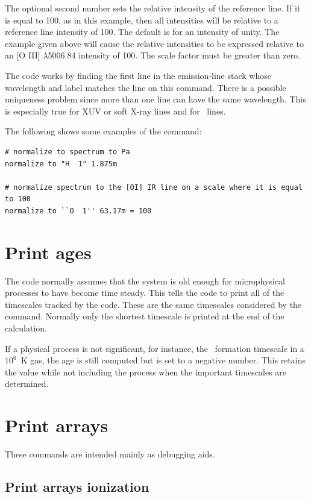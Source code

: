 The optional second number sets the relative intensity of the reference
line.
If it is equal to 100, as in this example, then all intensities will
be relative to a reference line intensity of 100.
The default is for an
intensity of unity.
The example given above will cause the relative
intensities to be expressed relative to an [O III] $\lambda$5006.84 intensity of 100.
The scale factor must be greater than zero.

The code works by finding the first line in the emission-line stack whose
wavelength and label matches the line on this command.
There is a possible
uniqueness problem since more than one line can have the same wavelength.
This is especially true for XUV or soft X-ray lines and for \htwo\ lines.

The following shows some examples of the  command:
\begin{verbatim}
# normalize to spectrum to Pa
normalize to "H  1" 1.875m

# normalize spectrum to the [OI] IR line on a scale where it is equal to 100
normalize to ``O  1'' 63.17m = 100
\end{verbatim}

\section{Print ages}

The code normally assumes that the system is old enough for microphysical
processes to have become time steady.  This tells the code to print all
of the timescales tracked by the code.
These are the same timescales
considered by the  command.
Normally only
the shortest timescale is printed at the end of the calculation.

If a physical process is not significant, for instance, the \htwo\ formation
timescale in a $10^6$~K gas,
the age is still computed but is set to a negative
number.
This retains the value while not including the process when the
important timescales are determined.


\section{Print arrays}

These commands are intended mainly as debugging aids.

\subsection{Print arrays ionization}

